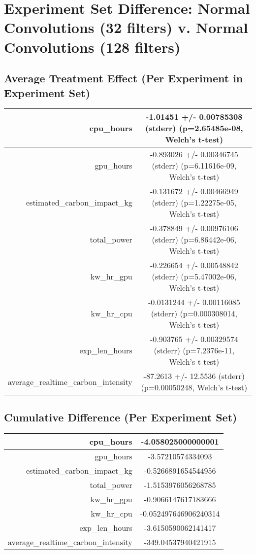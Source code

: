\documentclass{article}%
\begin{document}
%
\normalsize%
\section{Experiment Set Difference: Normal Convolutions (32 filters) v. Normal Convolutions (128 filters)}%
\label{sec:Experiment Set Difference Normal Convolutions (32 filters) v. Normal Convolutions (128 filters)}%
\subsection{Average Treatment Effect (Per Experiment in Experiment Set)}%
\label{subsec:Average Treatment Effect (Per Experiment in Experiment Set)}%
\begin{tabular}{|r|c|}%
\hline%
cpu\_hours&{-}1.01451 +/{-} 0.00785308 (stderr) (p=2.65485e{-}08, Welch's t{-}test)\\%
\hline%
gpu\_hours&{-}0.893026 +/{-} 0.00346745 (stderr) (p=6.11616e{-}09, Welch's t{-}test)\\%
\hline%
estimated\_carbon\_impact\_kg&{-}0.131672 +/{-} 0.00466949 (stderr) (p=1.22275e{-}05, Welch's t{-}test)\\%
\hline%
total\_power&{-}0.378849 +/{-} 0.00976106 (stderr) (p=6.86442e{-}06, Welch's t{-}test)\\%
\hline%
kw\_hr\_gpu&{-}0.226654 +/{-} 0.00548842 (stderr) (p=5.47002e{-}06, Welch's t{-}test)\\%
\hline%
kw\_hr\_cpu&{-}0.0131244 +/{-} 0.00116085 (stderr) (p=0.000308014, Welch's t{-}test)\\%
\hline%
exp\_len\_hours&{-}0.903765 +/{-} 0.00329574 (stderr) (p=7.2376e{-}11, Welch's t{-}test)\\%
\hline%
average\_realtime\_carbon\_intensity&{-}87.2613 +/{-} 12.5536 (stderr) (p=0.00050248, Welch's t{-}test)\\%
\hline%
\end{tabular}

%
\subsection{Cumulative Difference (Per Experiment Set)}%
\label{subsec:Cumulative Difference (Per Experiment Set)}%
\begin{tabular}{|r|c|}%
\hline%
cpu\_hours&{-}4.058025000000001\\%
\hline%
gpu\_hours&{-}3.57210574334093\\%
\hline%
estimated\_carbon\_impact\_kg&{-}0.5266891654544956\\%
\hline%
total\_power&{-}1.5153976056268785\\%
\hline%
kw\_hr\_gpu&{-}0.9066147617183666\\%
\hline%
kw\_hr\_cpu&{-}0.052497646906240314\\%
\hline%
exp\_len\_hours&{-}3.6150590062141417\\%
\hline%
average\_realtime\_carbon\_intensity&{-}349.04537940421915\\%
\hline%
\end{tabular}

%
\end{document}
